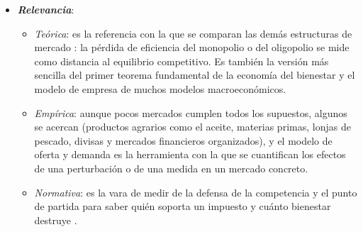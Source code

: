 \documentclass[11pt]{article}
\begin{document}
\begin{itemize}
\item \textbf{\emph{Relevancia}}:
  \begin{itemize}
  \item \emph{Teórica}: es la referencia con la que se comparan las demás estructuras de mercado   : la pérdida de eficiencia del monopolio o del oligopolio se mide como distancia al equilibrio competitivo. Es también la versión más sencilla del primer teorema fundamental de la economía del bienestar  y el modelo de empresa de muchos modelos macroeconómicos.
  \item \emph{Empírica}: aunque pocos mercados cumplen todos los supuestos, algunos se acercan (productos agrarios como el aceite, materias primas, lonjas de pescado, divisas y mercados financieros organizados), y el modelo de oferta y demanda es la herramienta con la que se cuantifican los efectos de una perturbación o de una medida en un mercado concreto.
  \item \emph{Normativa}: es la vara de medir de la defensa de la competencia  y el punto de partida para saber quién soporta un impuesto y cuánto bienestar destruye  .
  \end{itemize}


\end{itemize}
\end{document}
